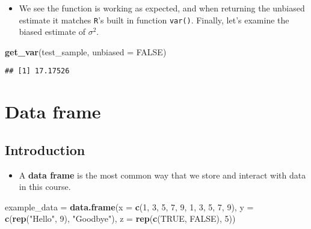 \documentclass[]{book}
\newenvironment{Shaded}{\begin{snugshade}}{\end{snugshade}}
\newcommand{\KeywordTok}[1]{\textcolor[rgb]{0.13,0.29,0.53}{\textbf{#1}}}
\newcommand{\DataTypeTok}[1]{\textcolor[rgb]{0.13,0.29,0.53}{#1}}
\newcommand{\DecValTok}[1]{\textcolor[rgb]{0.00,0.00,0.81}{#1}}
\newcommand{\StringTok}[1]{\textcolor[rgb]{0.31,0.60,0.02}{#1}}
\newcommand{\OtherTok}[1]{\textcolor[rgb]{0.56,0.35,0.01}{#1}}
\newcommand{\NormalTok}[1]{#1}
\providecommand{\tightlist}{%
  \setlength{\itemsep}{0pt}\setlength{\parskip}{0pt}}
\begin{document}
\begin{itemize}
\tightlist
\item
  We see the function is working as expected, and when returning the
  unbiased estimate it matches \texttt{R}'s built in function
  \texttt{var()}. Finally, let's examine the biased estimate of
  \(\sigma^2\).
\end{itemize}

\begin{Shaded}
\begin{Highlighting}[]
\KeywordTok{get_var}\NormalTok{(test_sample, }\DataTypeTok{unbiased =} \OtherTok{FALSE}\NormalTok{)}
\end{Highlighting}
\end{Shaded}

\begin{verbatim}
## [1] 17.17526
\end{verbatim}

\chapter{Data frame}\label{data-frame}

\section{Introduction}\label{introduction}

\begin{itemize}
\tightlist
\item
  A \textbf{data frame} is the most common way that we store and
  interact with data in this course.
\end{itemize}

\begin{Shaded}
\begin{Highlighting}[]
\NormalTok{example_data =}\StringTok{ }\KeywordTok{data.frame}\NormalTok{(}\DataTypeTok{x =} \KeywordTok{c}\NormalTok{(}\DecValTok{1}\NormalTok{, }\DecValTok{3}\NormalTok{, }\DecValTok{5}\NormalTok{, }\DecValTok{7}\NormalTok{, }\DecValTok{9}\NormalTok{, }\DecValTok{1}\NormalTok{, }\DecValTok{3}\NormalTok{, }\DecValTok{5}\NormalTok{, }\DecValTok{7}\NormalTok{, }\DecValTok{9}\NormalTok{),}
                          \DataTypeTok{y =} \KeywordTok{c}\NormalTok{(}\KeywordTok{rep}\NormalTok{(}\StringTok{"Hello"}\NormalTok{, }\DecValTok{9}\NormalTok{), }\StringTok{"Goodbye"}\NormalTok{),}
                          \DataTypeTok{z =} \KeywordTok{rep}\NormalTok{(}\KeywordTok{c}\NormalTok{(}\OtherTok{TRUE}\NormalTok{, }\OtherTok{FALSE}\NormalTok{), }\DecValTok{5}\NormalTok{))}
\end{Highlighting}
\end{Shaded}
\end{document}
